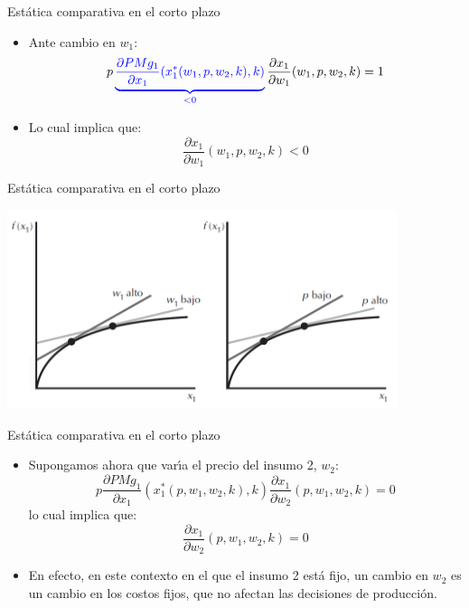 \documentclass{beamer}
\theoremstyle{definition}
\begin{document}
\begin{frame}[noframenumbering]{Est\'atica comparativa en el corto plazo} \small
	\begin{itemize}
		\item Ante cambio en $w_{1}$:
		\begin{equation*}
		p\color{blue}\underbrace{\frac{\partial{PMg_{1}}}{\partial{x_{1}}}(x_{1}^{*}(w_{1},p,w_{2},k),k)}_{<0}\color{black}\frac{\partial x_{1}}{\partial w_{1}}(w_{1},p,w_{2},k)=1
		\end{equation*}
		\item Lo cual implica que:
		\begin{equation*}
		\frac{\partial x_{1}}{\partial w_{1}}(w_{1},p,w_{2},k)<0
		\end{equation*}
	\end{itemize}
\end{frame}
\begin{frame}[noframenumbering]{Est\'atica comparativa en el corto plazo}
	\begin{center}
\includegraphics[width=4.5in]{figures3/static.png}
\end{center}
\end{frame}

\begin{frame}[noframenumbering]{Est\'atica comparativa en el corto plazo} \small

	\begin{itemize}
	\item Supongamos ahora que var\'{\i}a el precio del insumo 2, $w_{2}$:
\[
p\frac{\partial PMg_{1}}{\partial x_{1}}(x_{1}^*(p,w_{1},w_{2},k),k)\frac{\partial x_{1}}{\partial w_{2}}(p,w_{1},w_{2},k)=0
\]
lo cual implica que:
\[
\frac{\partial x_{1}}{\partial w_{2}}(p,w_{1},w_{2},k)=0
\]
\item En efecto, en este contexto en el que el insumo 2 est\'{a} fijo, un cambio
en $w_{2}$ es un cambio en los costos fijos, que no afectan las decisiones
de producci\'{o}n.
	\end{itemize}
\end{frame}		
\end{document}
